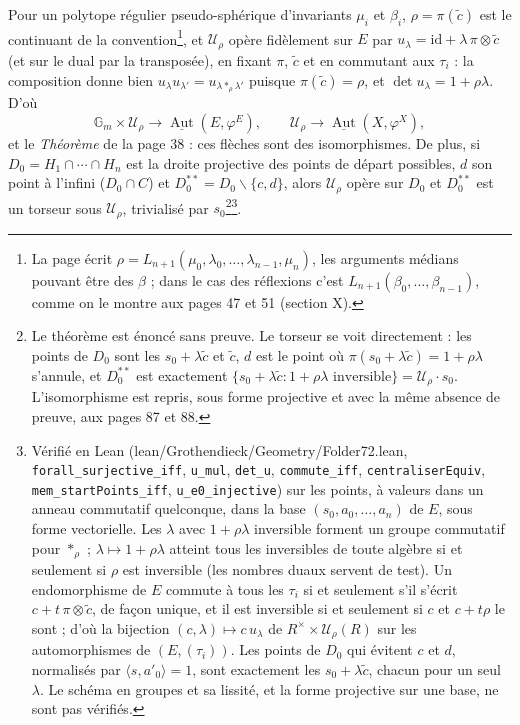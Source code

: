 \documentclass[11pt,a4paper]{article}
\begin{document}
Pour un polytope régulier pseudo-sphérique d'invariants $\mu_i$ et $\beta_i$,
$\rho = \pi(\tilde c)$ est le continuant de la convention\footnote{La page
écrit $\rho = L_{n+1}(\mu_0, \lambda_0, \ldots, \lambda_{n-1}, \mu_n)$, les
arguments médians pouvant être des $\beta$ ; dans le cas des réflexions
c'est $L_{n+1}(\beta_0, \ldots, \beta_{n-1})$, comme on le montre aux pages 47
et 51 (section X).}, et
$\mathcal{U}_\rho$ opère fidèlement sur $E$ par $u_\lambda = \mathrm{id} +
\lambda\, \pi \otimes \tilde c$ (et sur le dual par la transposée), en
fixant $\pi$, $\tilde c$ et en commutant aux $\tau_i$ : la composition donne
bien $u_\lambda u_{\lambda'} = u_{\lambda *_\rho \lambda'}$ puisque $\pi(\tilde
c) = \rho$, et $\det u_\lambda = 1 + \rho\lambda$. D'où
\[
\mathbb{G}_m \times \mathcal{U}_\rho \longrightarrow
\underline{\operatorname{Aut}}(E, \varphi^E), \qquad \mathcal{U}_\rho
\longrightarrow \underline{\operatorname{Aut}}(X, \varphi^X),
\]
et le \emph{Théorème} de la page 38 : ces flèches sont des isomorphismes. De
plus, si $D_0 = H_1 \cap \cdots \cap H_n$ est la droite projective des points de
départ possibles, $d$ son point à l'infini ($D_0 \cap C$) et $D_0^{**} = D_0
\smallsetminus \{c, d\}$, alors $\mathcal{U}_\rho$ opère sur $D_0$ et $D_0^{**}$
est un torseur sous $\mathcal{U}_\rho$, trivialisé par $s_0$\footnote{Le
théorème est énoncé sans preuve. Le torseur se voit directement : les points
de $D_0$ sont les $s_0 + \lambda\tilde c$ et $\tilde c$, $d$ est le point où
$\pi(s_0 + \lambda\tilde c) = 1 + \rho\lambda$ s'annule, et $D_0^{**}$ est
exactement $\{s_0 + \lambda\tilde c : 1 + \rho\lambda \text{ inversible}\} =
\mathcal{U}_\rho \cdot s_0$. L'isomorphisme est repris, sous forme projective et
avec la même absence de preuve, aux pages 87 et 88.}\footnote{Vérifié en Lean
(lean/Grothendieck/Geometry/Folder72.lean, \texttt{forall\_surjective\_iff},
\texttt{u\_mul}, \texttt{det\_u}, \texttt{commute\_iff},
\texttt{centraliserEquiv}, \texttt{mem\_startPoints\_iff},
\texttt{u\_e0\_injective}) sur les points, à valeurs dans un anneau commutatif
quelconque, dans la base $(s_0, a_0, \ldots, a_n)$ de $E$, sous forme
vectorielle. Les $\lambda$ avec $1 + \rho\lambda$ inversible forment un groupe
commutatif pour $*_\rho$ ; $\lambda \mapsto 1 + \rho\lambda$ atteint tous les
inversibles de toute algèbre si et seulement si $\rho$ est inversible (les
nombres duaux servent de test). Un endomorphisme de $E$ commute à tous les
$\tau_i$ si et seulement s'il s'écrit $c + t\,\pi \otimes \tilde c$, de façon
unique, et il est inversible si et seulement si $c$ et $c + t\rho$ le sont ;
d'où la bijection $(c, \lambda) \mapsto c\,u_\lambda$ de $R^\times \times
\mathcal{U}_\rho(R)$ sur les automorphismes de $(E, (\tau_i))$. Les points de
$D_0$ qui évitent $c$ et $d$, normalisés par $\langle s, a'_0 \rangle = 1$, sont
exactement les $s_0 + \lambda\tilde c$, chacun pour un seul $\lambda$. Le
schéma en groupes et sa lissité, et la forme projective sur une base, ne sont
pas vérifiés.}.
\end{document}

